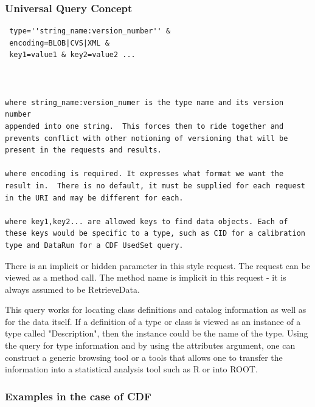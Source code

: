 \subsubsection{Universal Query Concept}

\begin{verbatim}
 type=''string_name:version_number'' &
 encoding=BLOB|CVS|XML &
 key1=value1 & key2=value2 ...



where string_name:version_numer is the type name and its version number
appended into one string.  This forces them to ride together and
prevents conflict with other notioning of versioning that will be
present in the requests and results.

where encoding is required. It expresses what format we want the 
result in.  There is no default, it must be supplied for each request 
in the URI and may be different for each.

where key1,key2... are allowed keys to find data objects. Each of 
these keys would be specific to a type, such as CID for a calibration
type and DataRun for a CDF UsedSet query.
\end{verbatim}

There is an implicit or hidden parameter in this style request.
The request can be viewed as a method call.  The method name is
implicit in this request - it is always assumed to be RetrieveData.

This query works for locating class definitions and catalog information
as well as for the data itself.  If a definition of a type or class is viewed
as an instance of a type called "Description", then the instance could be
the name of the type.  Using the query for type information and 
by using the attributes argument, one can construct a generic browsing
tool or a tools that allows one to transfer the information into 
a statistical analysis tool such as R or into ROOT.

\subsubsection{Examples in the case of CDF}

